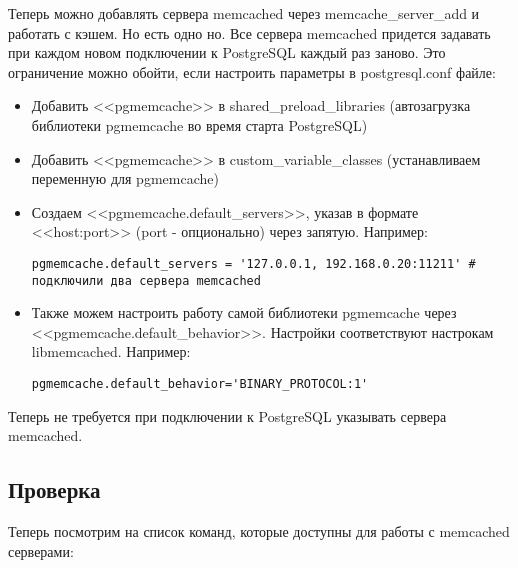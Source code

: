 Теперь можно добавлять сервера memcached через memcache\_server\_add и работать с кэшем. Но есть одно но. Все сервера memcached придется 
задавать при каждом новом подключении к PostgreSQL каждый раз заново. 
Это ограничение можно обойти, если настроить параметры в postgresql.conf файле:
\begin{itemize}
\item Добавить <<pgmemcache>> в shared\_preload\_libraries (автозагрузка библиотеки pgmemcache во время старта PostgreSQL)
\item Добавить <<pgmemcache>> в custom\_variable\_classes (устанавливаем переменную для pgmemcache)
\item Создаем <<pgmemcache.default\_servers>>, указав в формате <<host:port>> (port - опционально) через запятую. Например:
\begin{lstlisting}[label=lst:pgcache6,caption=Настройка default\_servers]
pgmemcache.default_servers = '127.0.0.1, 192.168.0.20:11211' # подключили два сервера memcached
\end{lstlisting}
\item Также можем настроить работу самой библиотеки pgmemcache через <<pgmemcache.default\_behavior>>. 
Настройки соответствуют настрокам libmemcached. Например:
\begin{lstlisting}[label=lst:pgcache7,caption=Настройка pgmemcache]
pgmemcache.default_behavior='BINARY_PROTOCOL:1'
\end{lstlisting}
\end{itemize}

Теперь не требуется при подключении к PostgreSQL указывать сервера memcached.

\subsection{Проверка}
Теперь посмотрим на список команд, которые доступны для работы с memcached серверами:

